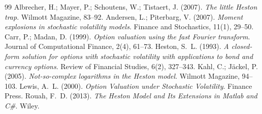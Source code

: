 \documentclass[11pt]{article}
\theoremstyle{plain}
\theoremstyle{definition}
\theoremstyle{remark}
\begin{document}
\begin{thebibliography}{99}
                  Albrecher, H.; Mayer, P.; Schoutens, W.; Tistaert, J. (2007). \emph{The little Heston trap}. Wilmott Magazine, 83--92.
     Andersen, L.; Piterbarg, V. (2007). \emph{Moment explosions in stochastic volatility models}. Finance and Stochastics, 11(1), 29--50.
             Carr, P.; Madan, D. (1999). \emph{Option valuation using the fast Fourier transform}. Journal of Computational Finance, 2(4), 61--73.
                Heston, S.~L. (1993). \emph{A closed-form solution for options with stochastic volatility with applications to bond and currency options}. Review of Financial Studies, 6(2), 327--343.
           Kahl, C.; J\"ackel, P. (2005). \emph{Not-so-complex logarithms in the Heston model}. Wilmott Magazine, 94--103.
                 Lewis, A.~L. (2000). \emph{Option Valuation under Stochastic Volatility}. Finance Press.
                 Rouah, F.~D. (2013). \emph{The Heston Model and Its Extensions in Matlab and C\#}. Wiley.
\end{thebibliography}
\end{document}
